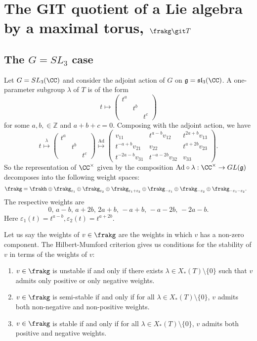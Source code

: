 \documentclass[12pt]{amsart}
\theoremstyle{plain}
\begin{document}
\section{The GIT quotient of a Lie algebra by a maximal torus, $\frakg \git T$}
\subsection{The $G=SL_3$ case}
Let $G = SL_3(\CC)$ and consider the adjoint action of $G$ on $\mathfrak{g} = \mathfrak{sl}_3(\CC)$.
A one-parameter subgroup $\lambda$ of $T$ is of the form
$$t \mapsto \begin{pmatrix} t^a & & \\ & t^b & \\ & & t^c \end{pmatrix}$$
for some $a, b, \in \mathbb{Z}$ and $a + b + c = 0$.
Composing with the adjoint action, we have
$$t 
\overset{\lambda}{\mapsto} \begin{pmatrix} t^a & & \\ & t^b & \\ & & t^c \end{pmatrix}
 \overset{\mathrm{Ad}}{\mapsto} \begin{pmatrix} v_{11} & t^{a-b} v_{12} & t^{2a+b} v_{13} \\ t^{-a+b} v_{21} & v_{22} & t^{a+2b} v_{23} \\ t^{-2a-b} v_{31} & t^{-a-2b} v_{32} & v_{33} \end{pmatrix}.$$
So the representation of $\CC^\times$ given by the composition $\mathrm{Ad} \circ \lambda: \CC^\times \to GL(\mathfrak{g})$ decomposes into the following weight spaces:
\begin{align*}
	\frakg &= \frakh \oplus \frakg_{\varepsilon_1} \oplus \frakg_{\varepsilon_2} \oplus \frakg_{\varepsilon_1 + \varepsilon_2} \oplus \frakg_{-\varepsilon_1} \oplus \frakg_{-\varepsilon_2} \oplus \frakg_{-\varepsilon_1 - \varepsilon_2}. 
\end{align*}
The respective weights are
$$0, \, a-b, \, a+2b, \, 2a+b, \, -a+b, \, -a-2b, \,-2a-b.$$
Here $\varepsilon_1(t) = t^{a-b}, \varepsilon_2(t) = t^{a+2b}$.

Let us say the weights of $v \in \frakg$ are the weights in which $v$ has a non-zero component.
The Hilbert-Mumford criterion gives us conditions for the stability of $v$ in terms of the weights of $v$:
\begin{enumerate}
\item $v \in \frakg$ is unstable if and only if there exists $\lambda \in X_*(T)\setminus\{0\}$ such that $v$ admits only positive or only negative weights.

\item $v \in \frakg$ is semi-stable if and only if for all $\lambda \in X_*(T)\setminus\{0\}$, $v$ admits both non-negative and non-positive weights.

\item $v \in \frakg$ is stable if and only if for all $\lambda \in X_*(T)\setminus\{0\}$, $v$ admits both positive and negative weights.
\end{enumerate}
\end{document}
